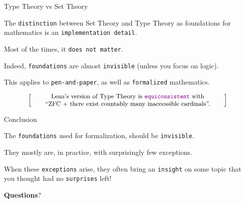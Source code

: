 \documentclass{beamer}
\begin{document}
\begin{frame}[fragile]{Type Theory vs Set Theory}

The {\color{violet}\verb`distinction`} between Set Theory and Type Theory as foundations for mathematics is an {\color{violet}\verb`implementation detail`}.

Most of the times, it {\color{violet}\verb`does not matter`}.

Indeed, {\color{violet}\verb`foundations`} are almost {\color{violet}\verb`invisible`} (unless you focus on logic).

This applies to {\color{violet}\verb`pen-and-paper`}, as well as {\color{violet}\verb`formalized`} mathematics.

\[
  \left[ \;
  \parbox{0.8\textwidth}{\centering\small
  Lean's version of Type Theory is {\color{violet}\texttt{equiconsistent}} with \\``ZFC + there exist countably many inaccessible cardinals''.
  }
  \; \right]
\]
\end{frame}

\begin{frame}[fragile]{Conclusion}

The {\color{violet}\verb`foundations`} used for formalization, should be {\color{violet}\verb`invisible`}.

They mostly are, in practice, with surprisingly few exceptions.

When these {\color{violet}\verb`exceptions`} arise, they often bring an {\color{violet}\verb`insight`} on some topic that you thought had no {\color{violet}\verb`surprises`} left!
\bigskip
\bigskip

\LARGE\centerline{
{\textbf{Questions}}?
}
\end{frame}
\end{document}
